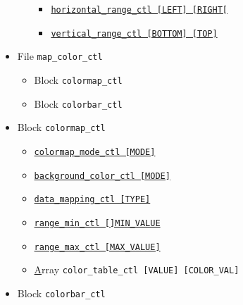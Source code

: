 \begin{itemize}
\begin{itemize}
\begin{itemize}
%
					\item \hyperref[href_t:horizontal_range_ctl]
							{\tt horizontal\_range\_ctl   [LEFT]  [RIGHT[}
					\item \hyperref[href_t:vertical_range_ctl]
							{\tt vertical\_range\_ctl   [BOTTOM]  [TOP]}
				\end{itemize}
		\end{itemize}
%
	\item File \verb|map_color_ctl|
				\label{href_i:map_color_ctl}
		\begin{itemize}
    			\item Block \verb|colormap_ctl|
 			\item Block \verb|colorbar_ctl|
		\end{itemize}
%
	\item Block \verb|colormap_ctl|
				\label{href_i:colormap_ctl}
		\begin{itemize}
			\item \hyperref[href_t:colormap_mode_ctl]
					{\tt colormap\_mode\_ctl    [MODE]}
			\item \hyperref[href_t:background_color_ctl]
					{\tt background\_color\_ctl    [MODE]}
%
			\item \hyperref[href_t:data_mapping_ctl]
					{\tt data\_mapping\_ctl    [TYPE]}
			\item \hyperref[href_t:range_min_ctl]
					{\tt range\_min\_ctl    []MIN\_VALUE}
			\item \hyperref[href_t:range_max_ctl]
					{\tt range\_max\_ctl    [MAX\_VALUE]}
			\item \hyperref[href_t:color_table_ctl]
					Array {\tt color\_table\_ctl    [VALUE]  [COLOR\_VAL]}
		\end{itemize}
%
	\item Block \verb|colorbar_ctl|
			\label{href_i:colorbar_ctl}
\end{itemize}
